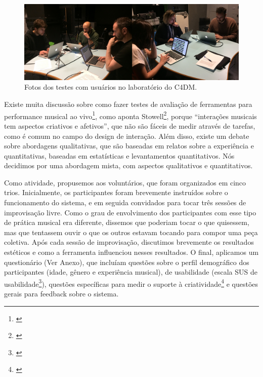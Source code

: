 \begin{figure}

\includegraphics[width=1\textwidth]{pictures/cap4/usertest}
\caption{\label{usertest}Fotos dos testes com usuários no laboratório do C4DM.}
\end{figure}


Existe muita discussão sobre como fazer testes de avaliação de ferramentas para performance musical ao vivo\footnote{\cite{Barbosa2015}}, como aponta Stowell\footnote{\cite{Stowell}}, porque ``interações musicais tem aspectos criativos e afetivos'', que não são fáceis de medir através de tarefas, como é comum no campo do design de interação. Além disso, existe um debate sobre abordagens qualitativas, que são baseadas em relatos sobre a experiência e quantitativas, baseadas em estatísticas e levantamentos quantitativos. Nós decidimos por uma abordagem mista, com aspectos qualitativos e quantitativos.

Como atividade, propusemos aos voluntários, que foram organizados em cinco trios. Inicialmente, os participantes foram brevemente instruídos sobre o funcionamento do sistema, e em seguida convidados para tocar três sessões de improvisação livre. Como o grau de envolvimento dos participantes com esse tipo de prática musical era diferente, dissemos que poderiam tocar o que quisessem, mas que tentassem ouvir o que os outros estavam tocando para compor uma peça coletiva. Após cada sessão de improvisação, discutimos brevemente os resultados estéticos e como a ferramenta influenciou nesses resultados. O final, aplicamos um questionário (Ver Anexo), que incluíam questões sobre o perfil demográfico dos participantes (idade, gênero e experiência musical), de usabilidade (escala SUS de usabilidade\footnote{\cite{Jordan1996}}), questões específicas para medir o suporte à criatividade\footnote{\cite{Cherry2014}} e questões gerais para feedback sobre o sistema. 

